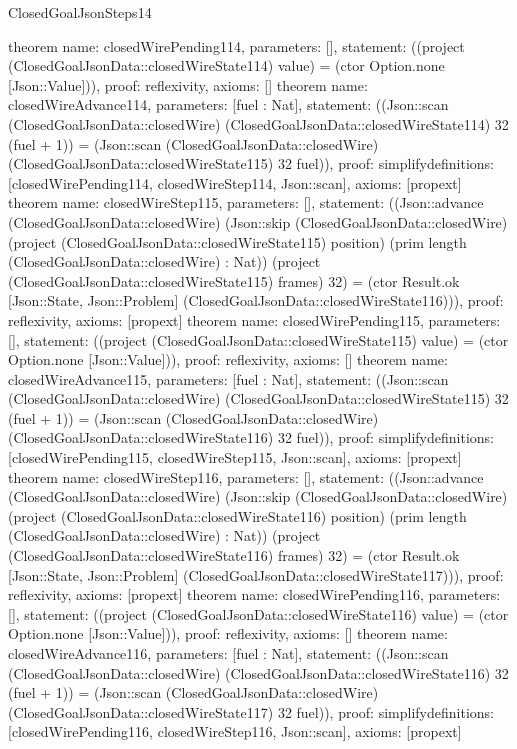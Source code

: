 \begin{lexlean}{ClosedGoalJsonSteps14}
\begin{semanticmodule}
{}
theorem{
 name: closedWirePending114, parameters: [],
 statement: ((project (ClosedGoalJsonData::closedWireState114) value) = (ctor Option.none [Json::Value])), proof: reflexivity{}, axioms: []
}
theorem{
 name: closedWireAdvance114, parameters: [fuel : Nat],
 statement: ((Json::scan (ClosedGoalJsonData::closedWire) (ClosedGoalJsonData::closedWireState114) 32 (fuel + 1)) = (Json::scan (ClosedGoalJsonData::closedWire) (ClosedGoalJsonData::closedWireState115) 32 fuel)), proof: simplify{definitions: [closedWirePending114, closedWireStep114, Json::scan]}, axioms: [propext]
}
theorem{
 name: closedWireStep115, parameters: [],
 statement: ((Json::advance (ClosedGoalJsonData::closedWire) (Json::skip (ClosedGoalJsonData::closedWire) (project (ClosedGoalJsonData::closedWireState115) position) (prim length (ClosedGoalJsonData::closedWire) : Nat)) (project (ClosedGoalJsonData::closedWireState115) frames) 32) = (ctor Result.ok [Json::State, Json::Problem] (ClosedGoalJsonData::closedWireState116))), proof: reflexivity{}, axioms: [propext]
}
theorem{
 name: closedWirePending115, parameters: [],
 statement: ((project (ClosedGoalJsonData::closedWireState115) value) = (ctor Option.none [Json::Value])), proof: reflexivity{}, axioms: []
}
theorem{
 name: closedWireAdvance115, parameters: [fuel : Nat],
 statement: ((Json::scan (ClosedGoalJsonData::closedWire) (ClosedGoalJsonData::closedWireState115) 32 (fuel + 1)) = (Json::scan (ClosedGoalJsonData::closedWire) (ClosedGoalJsonData::closedWireState116) 32 fuel)), proof: simplify{definitions: [closedWirePending115, closedWireStep115, Json::scan]}, axioms: [propext]
}
theorem{
 name: closedWireStep116, parameters: [],
 statement: ((Json::advance (ClosedGoalJsonData::closedWire) (Json::skip (ClosedGoalJsonData::closedWire) (project (ClosedGoalJsonData::closedWireState116) position) (prim length (ClosedGoalJsonData::closedWire) : Nat)) (project (ClosedGoalJsonData::closedWireState116) frames) 32) = (ctor Result.ok [Json::State, Json::Problem] (ClosedGoalJsonData::closedWireState117))), proof: reflexivity{}, axioms: [propext]
}
theorem{
 name: closedWirePending116, parameters: [],
 statement: ((project (ClosedGoalJsonData::closedWireState116) value) = (ctor Option.none [Json::Value])), proof: reflexivity{}, axioms: []
}
theorem{
 name: closedWireAdvance116, parameters: [fuel : Nat],
 statement: ((Json::scan (ClosedGoalJsonData::closedWire) (ClosedGoalJsonData::closedWireState116) 32 (fuel + 1)) = (Json::scan (ClosedGoalJsonData::closedWire) (ClosedGoalJsonData::closedWireState117) 32 fuel)), proof: simplify{definitions: [closedWirePending116, closedWireStep116, Json::scan]}, axioms: [propext]
}
\end{semanticmodule}
\end{lexlean}
